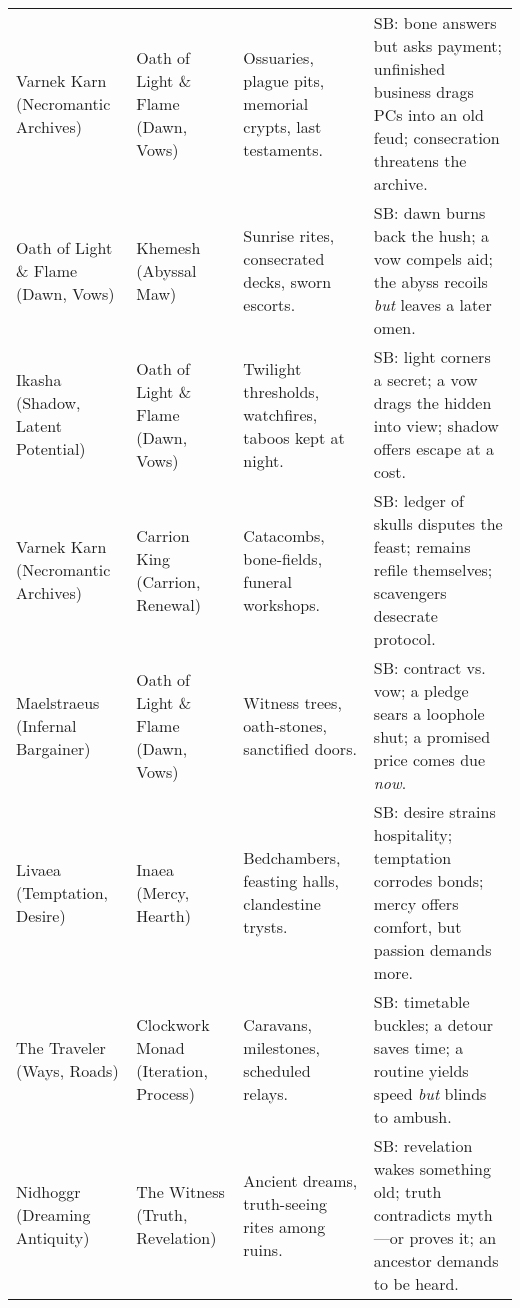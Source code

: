 \begin{longtable}{@{}p{3.3cm}p{3.3cm}p{4.6cm}p{7.2cm}@{}}
  Varnek Karn (Necromantic Archives) & Oath of Light \& Flame (Dawn, Vows) &
  Ossuaries, plague pits, memorial crypts, last testaments. &
  SB: bone answers but asks payment; unfinished business drags PCs into an old feud; consecration threatens the archive. \\
  
  Oath of Light \& Flame (Dawn, Vows) & Khemesh (Abyssal Maw) &
  Sunrise rites, consecrated decks, sworn escorts. &
  SB: dawn burns back the hush; a vow compels aid; the abyss recoils \emph{but} leaves a later omen. \\
  
  Ikasha (Shadow, Latent Potential) & Oath of Light \& Flame (Dawn, Vows) &
  Twilight thresholds, watchfires, taboos kept at night. &
  SB: light corners a secret; a vow drags the hidden into view; shadow offers escape at a cost. \\
  
  Varnek Karn (Necromantic Archives) & Carrion King (Carrion, Renewal) &
  Catacombs, bone-fields, funeral workshops. &
  SB: ledger of skulls disputes the feast; remains refile themselves; scavengers desecrate protocol. \\
  
  Maelstraeus (Infernal Bargainer) & Oath of Light \& Flame (Dawn, Vows) &
  Witness trees, oath-stones, sanctified doors. &
  SB: contract vs. vow; a pledge sears a loophole shut; a promised price comes due \emph{now}. \\
  
  Livaea (Temptation, Desire) & Inaea (Mercy, Hearth) &
  Bedchambers, feasting halls, clandestine trysts. &
  SB: desire strains hospitality; temptation corrodes bonds; mercy offers comfort, but passion demands more. \\
  
  The Traveler (Ways, Roads) & Clockwork Monad (Iteration, Process) &
  Caravans, milestones, scheduled relays. &
  SB: timetable buckles; a detour saves time; a routine yields speed \emph{but} blinds to ambush. \\
  
  Nidhoggr (Dreaming Antiquity) & The Witness (Truth, Revelation) &
  Ancient dreams, truth-seeing rites among ruins. &
  SB: revelation wakes something old; truth contradicts myth—or proves it; an ancestor demands to be heard. \\
  \bottomrule
  \end{longtable}
  

